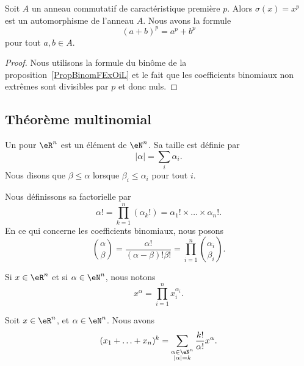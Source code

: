 \begin{proposition}     \label{Propqrrdem}
	Soit \( A\) un anneau commutatif de caractéristique première \( p\). Alors \( \sigma(x)=x^p\) est un automorphisme de l'anneau \( A\). Nous avons la formule
	\begin{equation}
		(a+b)^p=a^p+b^p
	\end{equation}
	pour tout \( a,b\in A\).
\end{proposition}

\begin{proof}
	Nous utilisons la formule du binôme de la proposition~\ref{PropBinomFExOiL} et le fait que les coefficients binomiaux non extrêmes sont divisibles par \( p\) et donc nuls.
\end{proof}

\subsection{Théorème multinomial}

\begin{definition}		\label{DEFooCQPRooFeWeOS}
	Un  pour \( \eR^n\) est un élément de \( \eN^n\). Sa taille est définie par
	\begin{equation}
		| \alpha |=\sum_i\alpha_i.
	\end{equation}
	Nous disons que \( \beta\leq \alpha\) lorsque \( \beta_i\leq \alpha_i\) pour tout \( i\).

	Nous définissons sa factorielle par
	\begin{equation}
		\alpha!=\prod_{k=1}^n(\alpha_k!)=\alpha_1!\times\ldots \times \alpha_n!.
	\end{equation}
	En ce qui concerne les coefficients binomiaux, nous posons
	\begin{equation}		\label{EQooKBURooKFBxnt}
		\binom{ \alpha }{ \beta }=\frac{ \alpha! }{ (\alpha-\beta)!\beta! }=\prod_{i=1}^n\binom{ \alpha_i }{ \beta_i }.
	\end{equation}

	Si \( x\in \eR^n\) et si \( \alpha\in \eN^n\), nous notons
	\begin{equation}
		x^{\alpha}=\prod_{i=1}^nx_i^{\alpha_i}.
	\end{equation}
\end{definition}

\begin{theorem}		\label{THOooNHAUooQvuytn}
	Soit \( x\in \eR^n\), et \( \alpha\in \eN^n\). Nous avons
	\begin{equation}
		(x_1+\ldots+x_n)^k=\sum_{\substack{ \alpha\in \eN^n \\ | \alpha |=k }  } \frac{ k! }{ \alpha! }x^{\alpha}.
	\end{equation}
\end{theorem}

